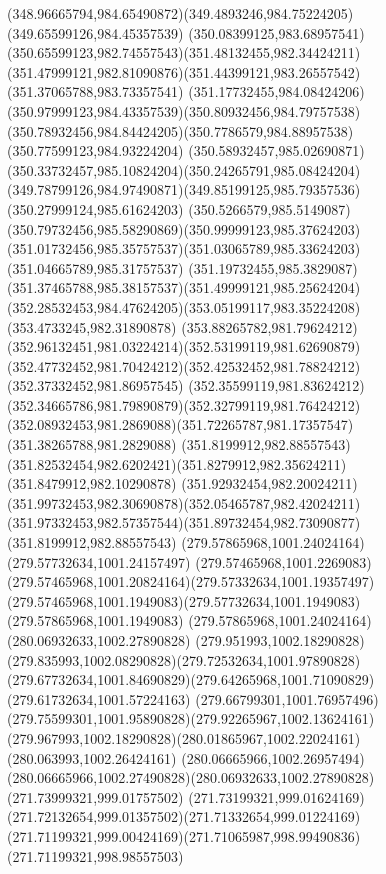 {{\curveto(348.96665794,984.65490872)(349.4893246,984.75224205)(349.65599126,984.45357539)
\curveto(350.08399125,983.68957541)(350.65599123,982.74557543)(351.48132455,982.34424211)
\curveto(351.47999121,982.81090876)(351.44399121,983.26557542)(351.37065788,983.73357541)
\curveto(351.17732455,984.08424206)(350.97999123,984.43357539)(350.80932456,984.79757538)
\curveto(350.78932456,984.84424205)(350.7786579,984.88957538)(350.77599123,984.93224204)
\curveto(350.58932457,985.02690871)(350.33732457,985.10824204)(350.24265791,985.08424204)
\curveto(349.78799126,984.97490871)(349.85199125,985.79357536)(350.27999124,985.61624203)
\curveto(350.5266579,985.5149087)(350.79732456,985.58290869)(350.99999123,985.37624203)
\curveto(351.01732456,985.35757537)(351.03065789,985.33624203)(351.04665789,985.31757537)
\curveto(351.19732455,985.3829087)(351.37465788,985.38157537)(351.49999121,985.25624204)
\curveto(352.28532453,984.47624205)(353.05199117,983.35224208)(353.4733245,982.31890878)
\curveto(353.88265782,981.79624212)(352.96132451,981.03224214)(352.53199119,981.62690879)
\curveto(352.47732452,981.70424212)(352.42532452,981.78824212)(352.37332452,981.86957545)
\curveto(352.35599119,981.83624212)(352.34665786,981.79890879)(352.32799119,981.76424212)
\curveto(352.08932453,981.2869088)(351.72265787,981.17357547)(351.38265788,981.2829088)
\moveto(351.8199912,982.88557543)
\curveto(351.82532454,982.6202421)(351.8279912,982.35624211)(351.8479912,982.10290878)
\curveto(351.92932454,982.20024211)(351.99732453,982.30690878)(352.05465787,982.42024211)
\curveto(351.97332453,982.57357544)(351.89732454,982.73090877)(351.8199912,982.88557543)
\moveto(279.57865968,1001.24024164)
\lineto(279.57732634,1001.24157497)
\curveto(279.57465968,1001.2269083)(279.57465968,1001.20824164)(279.57332634,1001.19357497)
\curveto(279.57465968,1001.1949083)(279.57732634,1001.1949083)(279.57865968,1001.1949083)
\lineto(279.57865968,1001.24024164)
\moveto(280.06932633,1002.27890828)
\curveto(279.951993,1002.18290828)(279.835993,1002.08290828)(279.72532634,1001.97890828)
\curveto(279.67732634,1001.84690829)(279.64265968,1001.71090829)(279.61732634,1001.57224163)
\curveto(279.66799301,1001.76957496)(279.75599301,1001.95890828)(279.92265967,1002.13624161)
\curveto(279.967993,1002.18290828)(280.01865967,1002.22024161)(280.063993,1002.26424161)
\curveto(280.06665966,1002.26957494)(280.06665966,1002.27490828)(280.06932633,1002.27890828)
\moveto(271.73999321,999.01757502)
\curveto(271.73199321,999.01624169)(271.72132654,999.01357502)(271.71332654,999.01224169)
\curveto(271.71199321,999.00424169)(271.71065987,998.99490836)(271.71199321,998.98557503)
}}
